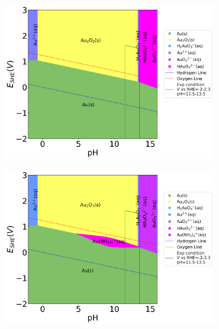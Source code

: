 \documentclass[journal=jacsat,manuscript=article]{achemso}
\begin{document}
\begin{figure}[htbp]
    \centering
    \begin{subfigure}[b]{0.3\textwidth}
        \subcaption{}\label{fig:Au_Pourbaix_H2O}
        \includegraphics[width=\textwidth]{Figures/pourbaix_diagrams/Au-NH3-H2O_activity=1e-04_[NH3]=0M_[Gly]=0M_[CN]=0.png}
    \end{subfigure}
    \begin{subfigure}[b]{0.3\textwidth}
        \subcaption{}\label{fig:Au_Pourbaix_NH3_Gly}
        \includegraphics[width=\textwidth]{Figures/pourbaix_diagrams/Au-NH3-H2O_activity=1e-04_[NH3]=0.02M_[Gly]=0.005M_[CN]=0.png}

\end{subfigure}
\end{figure}
\end{document}
